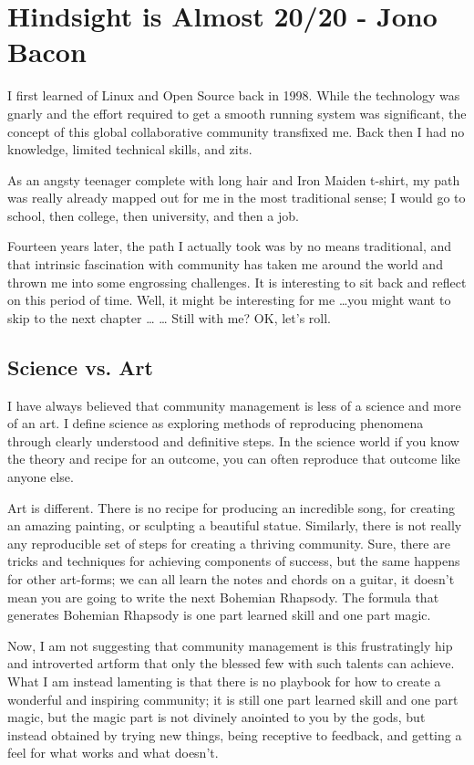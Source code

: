 \chapter{Hindsight is Almost 20/20 - Jono Bacon}
I first learned of Linux and Open Source back in 1998. While the technology was gnarly and the effort required to get a smooth running system was significant, the concept of this global collaborative community transfixed me. Back then I had no knowledge, limited technical skills, and zits.

As an angsty teenager complete with long hair and Iron Maiden t-shirt, my path was really already mapped out for me in the most traditional sense; I would go to school, then college, then university, and then a job.

Fourteen years later, the path I actually took was by no means traditional, and that intrinsic fascination with community has taken me around the world and thrown me into some engrossing challenges. It is interesting to sit back and reflect on this period of time. Well, it might be interesting for me \dots you might want to skip to the next chapter \dots 
\newline
\dots
\newline
Still with me? OK, let’s roll.

\section*{Science vs. Art}

I have always believed that community management is less of a science and more of an art. I define science as exploring methods of reproducing phenomena through clearly understood and definitive steps. In the science world if you know the theory and recipe for an outcome, you can often reproduce that outcome like anyone else.

Art is different. There is no recipe for producing an incredible song, for creating an amazing painting, or sculpting a beautiful statue. Similarly, there is not really any reproducible set of steps for creating a thriving community. Sure, there are tricks and techniques for achieving components of success, but the same happens for other art-forms; we can all learn the notes and chords on a guitar, it doesn’t mean you are going to write the next Bohemian Rhapsody. The formula that generates Bohemian Rhapsody is one part learned skill and one part magic.

Now, I am not suggesting that community management is this frustratingly hip and introverted artform that only the blessed few with such talents can achieve. What I am instead lamenting is that there is no playbook for how to create a wonderful and inspiring community; it is still one part learned skill and one part magic, but the magic part is not divinely anointed to you by the gods, but instead obtained by trying new things, being receptive to feedback, and getting a feel for what works and what doesn’t.


